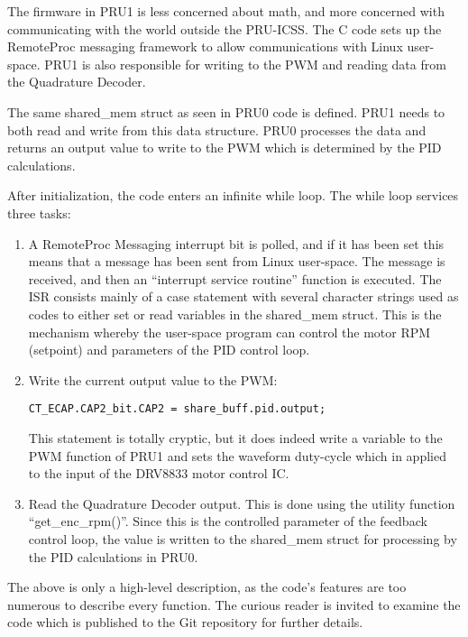 The firmware in PRU1 is less concerned about math, and more concerned with communicating with the world outside the PRU-ICSS.  The C code sets up the RemoteProc messaging framework to allow communications with Linux user-space.  PRU1 is also responsible for writing to the PWM and reading data from the Quadrature Decoder.

The same shared\_mem struct as seen in PRU0 code is defined.  PRU1 needs to both read and write from this data structure.  PRU0 processes the data and returns an output value to write to the PWM which is determined by the PID calculations.

After initialization, the code enters an infinite while loop.  The while loop services three tasks:

\begin{enumerate}
\item
A RemoteProc Messaging interrupt bit is polled, and if it has been set this means that a message has been sent from Linux user-space.  The message is received, and then an ``interrupt service routine'' function is executed.  The ISR consists mainly of a case statement with several character strings used as codes to either set or read variables in the shared\_mem struct.  This is the mechanism whereby the user-space program can control the motor RPM (setpoint) and parameters of the PID control loop.

\item Write the current output value to the PWM:

\begin{verbatim}
CT_ECAP.CAP2_bit.CAP2 = share_buff.pid.output;
\end{verbatim}

This statement is totally cryptic, but it does indeed write a variable to the PWM function of PRU1 and sets the waveform duty-cycle which in applied to the input of the DRV8833 motor control IC.
\item
Read the Quadrature Decoder output.  This is done using the utility function ``get\_enc\_rpm()''.  Since this is the controlled parameter of the feedback control loop, the value is written to the shared\_mem struct for processing by the PID calculations in PRU0.
\end{enumerate}

The above is only a high-level description, as the code's features are too numerous to describe every function.  The curious reader is invited to examine the code which is published to the Git repository for further details.

